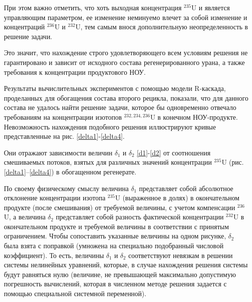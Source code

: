 При этом важно отметить, что хоть выходная концентрация $^{235}$U и является управляющим параметром, ее изменение неминуемо влечет за собой изменение и концентраций $^{236}$U и $^{232}$U, тем самым внося дополнительную неопределенность в решение задачи.

Это значит, что нахождение строго удовлетворяющего всем условиям решения не гарантировано и зависит от исходного состава регенерированного урана, а также требования к концентрации продуктового НОУ.

Результаты вычислительных экспериментов с помощью модели R-каскада, проделанных для обогащения состава второго рецикла, показали, что для данного состава не удалось найти решение задачи, которое бы одновременно отвечало требованиям на концентрации изотопов $^{232,234,236}$U в конечном НОУ-продукте. Невозможность нахождения подобного решения иллюстрируют кривые представленные на рис. \ref{delta1}-\ref{delta4}.

Они отражают зависимости величин $\delta_1$ и $\delta_2$ \ref{d1}-\ref{d2} от соотношения смешиваемых потоков, взятых для различных значений концентрации $^{235}$U (рис. \ref{delta1}--\ref{delta4}) в обогащенном регенерате.



По своему физическому смыслу величина $\delta_1$ представляет собой абсолютное отклонение концентрации изотопа $^{235}$U (выраженное в долях) в окончательном продукте (после смешивания) от требуемой величины, с учетом компенсации $^{236}$U, а величина $\delta_2$ представляет собой разность фактической концентрации $^{232}$U в окончательном продукте и требуемой величины в соответствии с принятым ограничением. Чтобы сопоставить указанные величины на одном рисунке, $\delta_2$ была взята с поправкой (умножена на специально подобранный числовой коэффициент). То есть, величины $\delta_1$ и $\delta_2$ соответствуют невязкам в решении системы нелинейных уравнений, которые, в случае нахождения решения системы будут равняться нулю (величине, не превышающей максимально допустимую погрешность вычислений, которая в численном методе решения задается с помощью специальной системной переменной).

